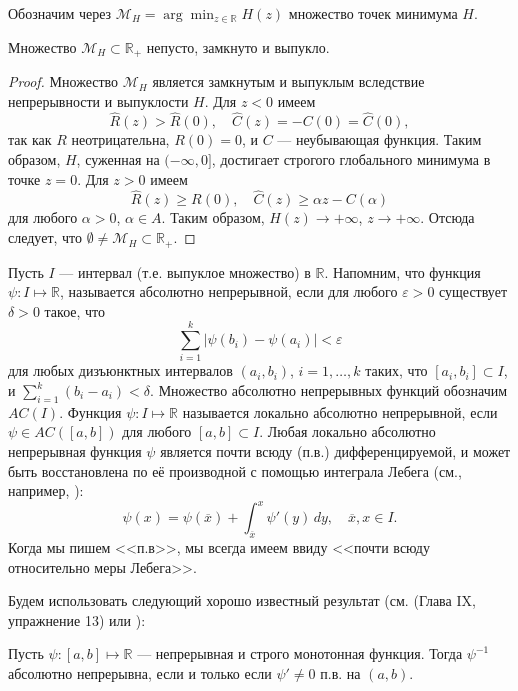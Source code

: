 Обозначим через $\mathscr M_H=\arg\min_{z\in\mathbb R} H(z)$ множество точек минимума $H$.
\begin{lemma} \label{lem:3.2}
Множество $\mathscr M_H\subset\mathbb R_+$ непусто, замкнуто и выпукло.
\end{lemma}
\begin{proof}
Множество $\mathscr M_H$ является замкнутым и выпуклым вследствие непрерывности и выпуклости $H$. Для $z<0$ имеем
$$\widehat R(z)>\widehat R(0),\quad \widehat C(z)=-C(0)=\widehat C(0),$$
так как $R$ неотрицательна, $R(0)=0$, и $C$ --- неубывающая функция. Таким образом, $H$, суженная на $(-\infty,0]$, достигает строгого глобального минимума в точке $z=0$. Для $z>0$ имеем
$$\widehat R(z)\ge R(0),\quad \widehat C (z)\ge \alpha z-C(\alpha)$$
для любого $\alpha>0$, $\alpha\in A$. Таким образом, $H(z)\to +\infty$, $z\to +\infty$. Отсюда следует, что $\emptyset\neq\mathscr M_H\subset\mathbb R_+$.
\end{proof}

Пусть $I$ --- интервал (т.е. выпуклое множество) в $\mathbb R$. Напомним, что функция $\psi:I\mapsto\mathbb R$, называется абсолютно непрерывной, если для любого $\varepsilon>0$ существует $\delta>0$ такое, что
$$ \sum_{i=1}^k |\psi(b_i)-\psi(a_i)|<\varepsilon $$
для любых дизъюнктных интервалов $(a_i,b_i)$, $i=1,\dots,k$ таких, что $[a_i,b_i]\subset I$, и
$ \sum_{i=1}^k (b_i-a_i)<\delta. $
Множество абсолютно непрерывных функций обозначим $AC(I)$. Функция $\psi:I\mapsto\mathbb R$ называется локально абсолютно непрерывной, если $\psi \in AC([a,b])$ для любого $[a,b]\subset I$. Любая локально абсолютно непрерывная функция $\psi$ является почти всюду (п.в.) дифференцируемой, и может быть восстановлена по её производной с помощью интеграла Лебега (см., например, \cite[Theorem 3.30]{Leo09}):
$$ \psi(x)=\psi(\overline x)+\int_{\overline x}^x\psi'(y)\,dy,\quad \overline x, x\in I.$$
Когда мы пишем <<п.в>>, мы всегда имеем ввиду <<почти всюду относительно меры Лебега>>.

Будем использовать следующий хорошо известный результат (см. \cite{Nat64} (Глава IX, упражнение 13) или \cite[теорема 2]{Vill84}):
\begin{lemma} \label{lem:3.3}
Пусть $\psi:[a,b]\mapsto\mathbb R$ --- непрерывная и строго монотонная функция. Тогда $\psi^{-1}$ абсолютно непрерывна, если и только если $\psi'\neq 0$ п.в. на $(a,b)$.
\end{lemma}

